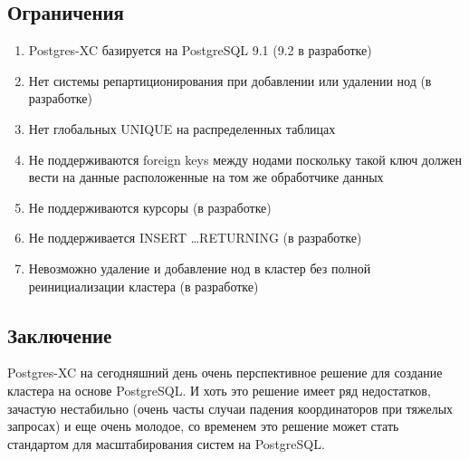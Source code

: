 \subsection{Ограничения}

\begin{enumerate}
\item Postgres-XC базируется на PostgreSQL 9.1 (9.2 в разработке)
\item Нет системы репартиционирования при добавлении или удалении нод (в разработке)
\item Нет глобальных UNIQUE на распределенных таблицах
\item Не поддерживаются foreign keys между нодами поскольку такой ключ должен вести на данные расположенные на том же обработчике данных
\item Не поддерживаются курсоры (в разработке)
\item Не поддерживается INSERT \dots RETURNING (в разработке)
\item Невозможно удаление и добавление нод в кластер без полной реинициализации кластера (в разработке)
\end{enumerate}

\subsection{Заключение}
Postgres-XC на сегодняшний день очень перспективное решение для создание кластера на основе PostgreSQL. И хоть это решение имеет ряд недостатков, зачастую нестабильно (очень часты случаи падения координаторов при тяжелых запросах) и еще очень молодое, со временем это решение может стать стандартом для масштабирования систем на PostgreSQL.